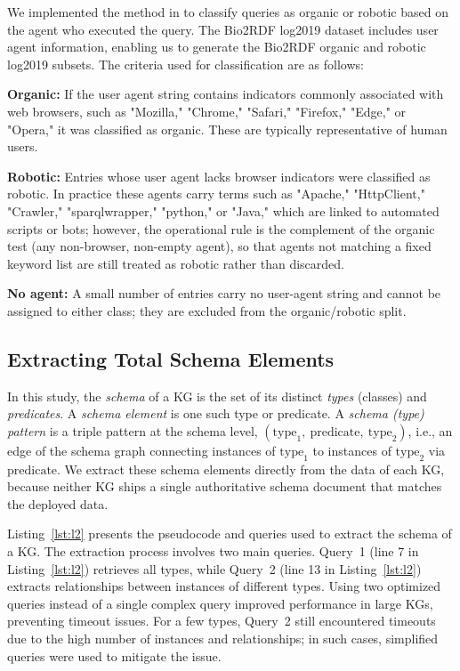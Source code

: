 \documentclass[sw]{iosart2x}
\begin{document}
We implemented the method in \cite{bielefeldt2018practical, malyshev2018getting} to classify queries as organic or robotic based on the agent who executed the query. The Bio2RDF log2019 dataset includes user agent information, enabling us to generate the Bio2RDF organic and robotic log2019 subsets. The criteria used for classification are as follows:

\textbf{Organic:} If the user agent string contains indicators commonly associated with web browsers, such as "Mozilla," "Chrome," "Safari," "Firefox," "Edge," or "Opera," it was classified as organic. These are typically representative of human users.

\textbf{Robotic:} Entries whose user agent lacks browser indicators were classified as robotic. In practice these agents carry terms such as "Apache," "HttpClient," "Crawler," "sparqlwrapper," "python," or "Java," which are linked to automated scripts or bots; however, the operational rule is the complement of the organic test (any non-browser, non-empty agent), so that agents not matching a fixed keyword list are still treated as robotic rather than discarded.

\textbf{No agent:} A small number of entries carry no user-agent string and cannot be assigned to either class; they are excluded from the organic/robotic split.

\subsection{Extracting Total Schema Elements}

In this study, the \emph{schema} of a KG is the set of its distinct \emph{types} (classes) and \emph{predicates}. A \emph{schema element} is one such type or predicate. A \emph{schema (type) pattern} is a triple pattern at the schema level, $(\text{type}_1,\ \text{predicate},\ \text{type}_2)$, i.e., an edge of the schema graph connecting instances of $\text{type}_1$ to instances of $\text{type}_2$ via $\text{predicate}$. We extract these schema elements directly from the data of each KG, because neither KG ships a single authoritative schema document that matches the deployed data.

Listing~\ref{lst:l2} presents the pseudocode and queries used to extract the schema of a KG. The extraction process involves two main queries. Query~1 (line 7 in Listing~\ref{lst:l2}) retrieves all types, while Query~2 (line 13 in Listing~\ref{lst:l2}) extracts relationships between instances of different types. Using two optimized queries instead of a single complex query improved performance in large KGs, preventing timeout issues. For a few types, Query~2 still encountered timeouts due to the high number of instances and relationships; in such cases, simplified queries were used to mitigate the issue.
\end{document}
